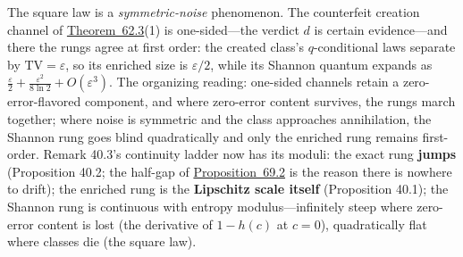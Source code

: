 \begin{thmrem}

The square law is a \emph{symmetric-noise} phenomenon. The counterfeit creation channel of \hyperlink{stmt:62.3}{Theorem~62.3}(1) is one-sided---\hspace{0pt}the verdict \(d\) is certain evidence---\hspace{0pt}and there the rungs agree at first order: the created class's \(q\)-conditional laws separate by \(\mathrm{TV} = \varepsilon\), so its enriched size is \(\varepsilon/2\), while its Shannon quantum expands as \(\tfrac{\varepsilon}{2} + \tfrac{\varepsilon^2}{8 \ln 2} + O(\varepsilon^3)\). The organizing reading: one-sided channels retain a zero-error-flavored component, and where zero-error content survives, the rungs march together; where noise is symmetric and the class approaches annihilation, the Shannon rung goes blind quadratically and only the enriched rung remains first-order. Remark 40.3's continuity ladder now has its moduli: the exact rung \textbf{jumps} (Proposition 40.2; the half-gap of \hyperlink{stmt:69.2}{Proposition~69.2} is the reason there is nowhere to drift); the enriched rung is the \textbf{Lipschitz scale itself} (Proposition 40.1); the Shannon rung is continuous with entropy modulus---\hspace{0pt}infinitely steep where zero-error content is lost (the derivative of \(1 - h(c)\) at \(c = 0\)), quadratically flat where classes die (the square law).
\end{thmrem}


